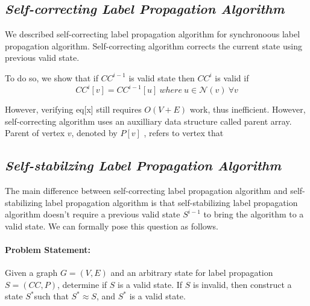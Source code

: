 \subsection{\emph{Self-correcting Label Propagation Algorithm}}

We described self-correcting label propagation algorithm for synchronoous
label propagation algorithm. Self-correcting algorithm corrects the
current state using previous valid state. 

To do so, we show that if $CC^{i-1}$ is valid state then $CC^{i}$
is valid if 
\begin{equation}
CC^{i}[v]=CC^{i-1}[u]\ where\ u\in\mathcal{N}(v)\ \forall v
\end{equation}

However, verifying eq{[}x{]} still requires $O(V+E)$ work, thus inefficient.
However, self-correcting algorithm uses an auxilliary data structure
called parent array. Parent of vertex $v$, denoted by $P[v]$ , refers
to vertex that 

\subsection{\emph{Self-stabilzing Label Propagation Algorithm} }

The main difference between self-correcting label propagation algorithm
and self-stabilizing label propagation algorithm is that self-stabilizing
label propagation algorithm doesn't require a previous valid state
$S^{i-1}$ to bring the algorithm to a valid state. We can formally
pose this question as follows.

\paragraph*{Problem Statement:}

Given a graph $G=\left(V,E\right)$ and an arbitrary state for label
propagation $S=\left(CC,P\right)$, determine if $S$ is a valid state.
If $S$ is invalid, then construct a state $S^{*}$such that $S^{*}\approx S$,
and $S^{*}$ is a valid state. 

